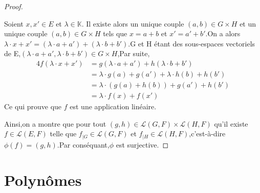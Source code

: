 \documentclass[12pt]{book}
\theoremstyle{definition}\newtheorem{dfn}{Définition}[chapter]
\theoremstyle{plain}\newtheorem{thm}{Théorème}[chapter]
\theoremstyle{plain}\newtheorem{prp}{Proposition}[chapter]
\theoremstyle{plain}\newtheorem{lem}{\bf Lemme}[chapter]
\theoremstyle{plain}\newtheorem{axm}{\bf Axiome}[chapter]
\theoremstyle{plain}\newtheorem{lmm}{\bf Lemme}[chapter]
\theoremstyle{plain}\newtheorem{cor}{\bf Corollaire}[chapter]
\theoremstyle{remark}\newtheorem{rem}{Remarque}[chapter]
\begin{document}
\begin{proof}
\begin{itemize}
\begin{itemize}
 Soient $x,x'\in E$ et $\lambda \in \mathbb{K}$.
 Il existe alors un unique couple $(a,b)\in G\times H$ et un unique couple $(a,b)\in G\times H$ tels que $x=a+b$ et $x'=a'+b'$.On a alors $\lambda \cdot x+x'=(\lambda\cdot a+a')+(\lambda\cdot b+b')$.G et H étant des sous-espaces vectoriels de E,$ (\lambda\cdot a+a',\lambda\cdot b+b')\in G\times H$,Par suite,
 \begin{alignat*}{4}
 f(\lambda\cdot x+x')&=g(\lambda\cdot a+a')+h(\lambda\cdot b+b')\\
 &=\lambda \cdot g(a)+g(a')+\lambda\cdot h(b)+h(b')\\
 &=\lambda\cdot(g(a)+h(b))+g(a')+h(b')\\
 &=\lambda\cdot f(x)+f(x')
 \end{alignat*}
 Ce qui prouve que $f$ est une application linéaire.
\end{itemize}
\end{itemize}
Ainsi,on a montre que pour tout $(g,h)\in \mathcal{L}(G,F)\times \mathcal{L}(H,F)$ qu'il existe $f\in \mathcal{L}(E,F)$ telle que
$f_{|G}\in\mathcal{L}(G,F)$
et $f_{|H}\in\mathcal{L}(H,F)$,c'est-à-dire $\phi(f)=(g,h)$.Par conséquant,$\phi$ est surjective.

\end{proof}
\chapter{Polynômes}
\end{document}
